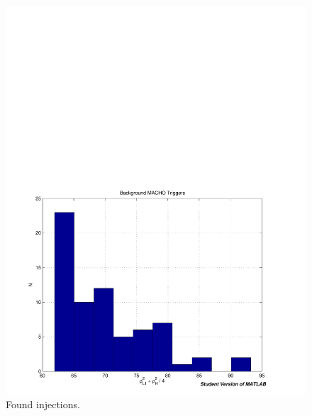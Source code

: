 \begin{figure}[p]
\begin{center}
\includegraphics[width=\textwidth]{analysis/figures/bkg_hist}
\end{center}
\caption{\label{f:bkg_hist}%
Found injections.
}
\end{figure}

